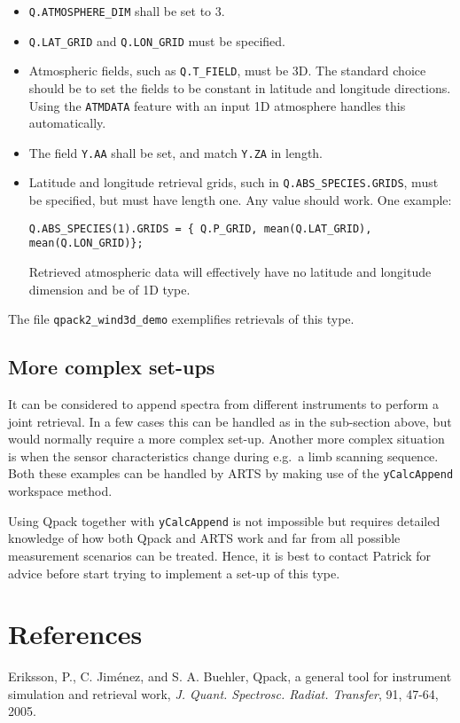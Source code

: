\documentclass[a4paper,11pt]{article}
\begin{document}
\begin{itemize}
\item \verb|Q.ATMOSPHERE_DIM| shall be set to 3.
\item \verb|Q.LAT_GRID| and \verb|Q.LON_GRID| must be specified.
\item Atmospheric fields, such as \verb|Q.T_FIELD|, must be 3D. The standard
  choice should be to set the fields to be constant in latitude and longitude
  directions. Using the \verb|ATMDATA| feature with an input 1D atmosphere
  handles this automatically.
\item The field \verb|Y.AA| shall be set, and match \verb|Y.ZA| in length.
\item Latitude and longitude retrieval grids, such in
  \verb|Q.ABS_SPECIES.GRIDS|, must be specified, but must have length one. Any
  value should work. One example:
\begin{verbatim}
Q.ABS_SPECIES(1).GRIDS = { Q.P_GRID, mean(Q.LAT_GRID), mean(Q.LON_GRID)};
\end{verbatim}
Retrieved atmospheric data will effectively have no latitude and longitude
dimension and be of 1D type.
\end{itemize}
The file \verb|qpack2_wind3d_demo| exemplifies retrievals of this type.


\subsection{More complex set-ups}
%
It can be considered to append spectra from different instruments to perform a
joint retrieval. In a few cases this can be handled as in the sub-section
above, but would normally require a more complex set-up. Another more complex
situation is when the sensor characteristics change during e.g.\ a limb
scanning sequence. Both these examples can be handled by ARTS by making use of
the \verb|yCalcAppend| workspace method.

Using Qpack together with \verb|yCalcAppend| is not impossible but requires
detailed knowledge of how both Qpack and ARTS work and far from all possible
measurement scenarios can be treated. Hence, it is best to contact Patrick
for advice before start trying to implement a set-up of this type.




\section*{References}
Eriksson, P., C. Jim\'enez, and S. A. Buehler, Qpack, a general tool for
instrument simulation and retrieval work, {\it J. Quant. Spectrosc. Radiat.
  Transfer}, 91, 47-64, 2005. \vspace{1ex}
\end{document}
